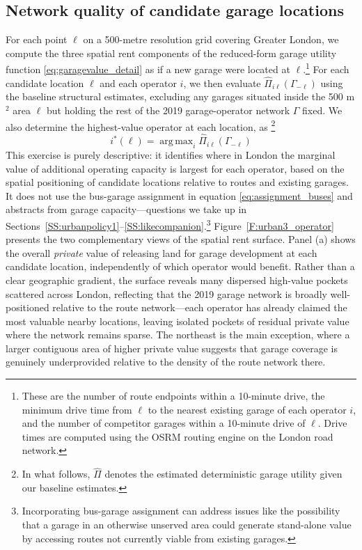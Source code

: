 \documentclass[12pt]{article}
\DeclareMathOperator*{\argmax}{arg\,max}
\begin{document}
\subsection{Network quality of candidate garage locations}\label{SS:UP3}
For each point $\ell$ on a 500-metre resolution grid covering Greater London, 
we compute the three spatial rent components of the reduced-form garage utility 
function \eqref{eq:garagevalue_detail} as if a new garage were located at 
$\ell$.\footnote{These are the number of route endpoints within a 10-minute drive, the minimum drive time from $\ell$ to the 
nearest existing garage of each operator $i$, 
and the number of competitor garages within a 10-minute drive of $\ell$. Drive times are computed using the OSRM 
routing engine on the London road network.} For each candidate location $\ell$ 
and each operator $i$, we then evaluate $\hat{\Pi}_{i\ell}(\Gamma_{-\ell})$ using the 
baseline structural estimates, excluding any garages situated inside the 500 m$^2$ area $\ell$ but holding the rest of the 2019 garage-operator 
network $\Gamma$ fixed. We also determine the highest-value operator at each location, as \footnote{In what follows, $\hat{\Pi}$ denotes the estimated deterministic garage utility given our baseline estimates.}
$$i^*(\ell) = \argmax_i \hat{\Pi}_{i\ell}(\Gamma_{-\ell})$$
This exercise is purely 
descriptive: it identifies where in London the marginal value of additional 
operating capacity is largest for each operator, based on the spatial 
positioning of candidate locations relative to routes and existing garages. 
It does not use the bus-garage assignment in equation \eqref{eq:assignment_buses} and abstracts from garage 
capacity---questions we take up in Sections~\ref{SS:urbanpolicy1}--\ref{SS:likecompanion}.\footnote{Incorporating bus-garage assignment can address issues like the possibility that a garage in an otherwise 
unserved area could generate stand-alone value by accessing routes not 
currently viable from existing garages.} Figure~\ref{F:urban3_operator} presents the two complementary views of the 
spatial rent surface. Panel (a) shows the overall \emph{private} value of 
releasing land for garage development at each candidate location, 
independently of which operator would benefit. Rather than a clear geographic 
gradient, the surface reveals many dispersed high-value pockets scattered 
across London, reflecting that the 2019 garage network is broadly 
well-positioned relative to the route network---each operator has already 
claimed the most valuable nearby locations, leaving isolated pockets of 
residual private value where the network remains sparse. The northeast is 
the main exception, where a larger contiguous area of higher private value 
suggests that garage coverage is genuinely underprovided relative to the 
density of the route network there. 
\end{document}

